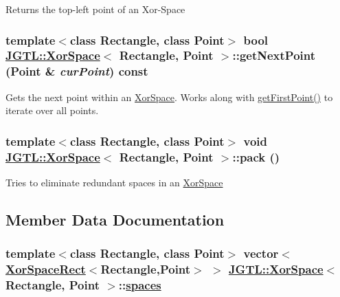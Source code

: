 Returns the top-left point of an Xor-Space \hypertarget{class_j_g_t_l_1_1_xor_space_88d290e087366c43f48ba39f3df78931}{
\subsubsection[getNextPoint]{\setlength{\rightskip}{0pt plus 5cm}template$<$class Rectangle, class Point$>$ bool \hyperlink{class_j_g_t_l_1_1_xor_space}{JGTL::Xor\-Space}$<$ Rectangle, Point $>$::get\-Next\-Point (Point \& {\em cur\-Point}) const}}
\label{class_j_g_t_l_1_1_xor_space_88d290e087366c43f48ba39f3df78931}


Gets the next point within an \hyperlink{class_j_g_t_l_1_1_xor_space}{Xor\-Space}. Works along with \hyperlink{class_j_g_t_l_1_1_xor_space_fc844c1202940bc5340cf01a4431cbab}{get\-First\-Point()} to iterate over all points. \hypertarget{class_j_g_t_l_1_1_xor_space_a699867cb9debc04136fbbc8ccc4ff6f}{
\subsubsection[pack]{\setlength{\rightskip}{0pt plus 5cm}template$<$class Rectangle, class Point$>$ void \hyperlink{class_j_g_t_l_1_1_xor_space}{JGTL::Xor\-Space}$<$ Rectangle, Point $>$::pack ()}}
\label{class_j_g_t_l_1_1_xor_space_a699867cb9debc04136fbbc8ccc4ff6f}


Tries to eliminate redundant spaces in an \hyperlink{class_j_g_t_l_1_1_xor_space}{Xor\-Space} 

\subsection{Member Data Documentation}
\hypertarget{class_j_g_t_l_1_1_xor_space_107013005de6d1b3b7c5e6067b2054c5}{
\subsubsection[spaces]{\setlength{\rightskip}{0pt plus 5cm}template$<$class Rectangle, class Point$>$ vector$<$\hyperlink{class_j_g_t_l_1_1_xor_space_rect}{Xor\-Space\-Rect}$<$Rectangle,Point$>$ $>$ \hyperlink{class_j_g_t_l_1_1_xor_space}{JGTL::Xor\-Space}$<$ Rectangle, Point $>$::\hyperlink{class_j_g_t_l_1_1_xor_space_107013005de6d1b3b7c5e6067b2054c5}{spaces}}}
\label{class_j_g_t_l_1_1_xor_space_107013005de6d1b3b7c5e6067b2054c5}


